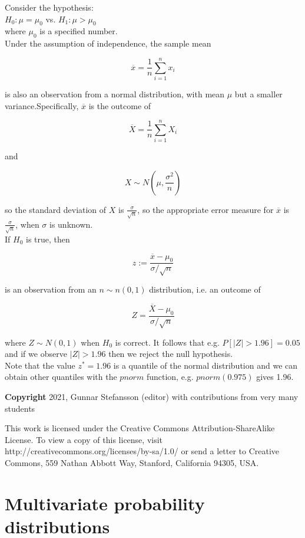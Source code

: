 \documentclass[12pt,a4paper]{article}
\theoremstyle{regla}
\theoremstyle{remark}
\theoremstyle{definition}
\theoremstyle{nonumberbreak}
\begin{document}
Consider the hypothesis:\\

$H_0: \mu = \mu_0$  vs. $H_1: \mu > \mu_0$\\

where $\mu_0$ is a specified number.\\

Under the assumption of independence, the sample mean

$$\overline{x} = \frac{1}{n} \sum^n_{i=1}x_i$$

is also an observation from a normal distribution, with mean $\mu$ but a smaller variance.Specifically, $\overline{x}$ is the outcome of

$$\overline{X} = \frac{1}{n} \sum^n_{i=1}X_i$$

and 

$$X \sim N(\mu, \frac{ \sigma^2}{n})$$

so the standard deviation of $X$ is $\frac{\sigma}{\sqrt{n}}$, so the appropriate error measure for $\overline{x}$ is $\frac{\sigma}{\sqrt{n}}$, when $\sigma$ is unknown.\\

If $H_0$ is true, then

$$z:= \frac{\overline{x}-\mu_0}{\sigma / \sqrt{n}}$$

is an observation from an $n \sim n (0,1)$ distribution, i.e. an outcome of 

$$Z= \frac{\overline{X}-\mu_0}{\sigma / \sqrt{n}}$$

where $Z \sim N(0,1)$ when $H_0$ is correct. It follows that e.g. $P[\vert Z \vert > 1.96] = 0.05$ and if we observe $\vert Z \vert > 1.96$ then we reject the null hypothesis.\\

Note that the value $z^\ast = 1.96$ is a quantile of the normal distribution and we can obtain other quantiles with the $pnorm$ function, e.g. $pnorm(0.975)$ gives 1.96.

{\bf Copyright}
2021, Gunnar Stefansson (editor) with contributions from very many students

This work is licensed under the Creative Commons
Attribution-ShareAlike License. To view a copy of this license, visit
http://creativecommons.org/licenses/by-sa/1.0/ or send a letter to
Creative Commons, 559 Nathan Abbott Way, Stanford, California 94305,
USA.
\clearpage
\section{Multivariate probability distributions}
\end{document}
